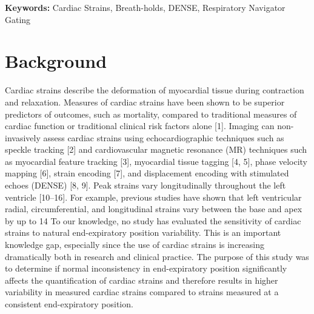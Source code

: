 	\noindent \textbf{Keywords:} Cardiac Strains, Breath-holds, DENSE, Respiratory Navigator Gating
	
\newpage

\section{Background}
	Cardiac strains describe the deformation of myocardial tissue during contraction and relaxation. Measures of cardiac strains have been shown to be superior predictors of outcomes, such as mortality, compared to traditional measures of cardiac function or traditional clinical risk factors alone [1]. Imaging can non-invasively assess cardiac strains using echocardiographic techniques such as speckle tracking [2] and cardiovascular magnetic resonance (MR) techniques such as myocardial feature tracking [3], myocardial tissue tagging [4, 5], phase velocity mapping [6], strain encoding [7], and displacement encoding with stimulated echoes (DENSE) [8, 9].
	Peak strains vary longitudinally throughout the left ventricle [10–16]. For example, previous studies have shown that left ventricular radial, circumferential, and longitudinal strains vary between the base and apex by up to 14%
	To our knowledge, no study has evaluated the sensitivity of cardiac strains to natural end-expiratory position variability. This is an important knowledge gap, especially since the use of cardiac strains is increasing dramatically both in research and clinical practice. The purpose of this study was to determine if normal inconsistency in end-expiratory position significantly affects the quantification of cardiac strains and therefore results in higher variability in measured cardiac strains compared to strains measured at a consistent end-expiratory position.
	

